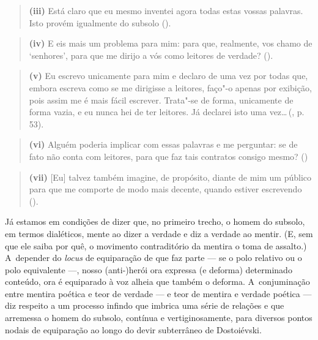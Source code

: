 \begin{quote}
\textbf{(iii)} Está claro que eu mesmo inventei agora todas estas vossas
palavras. Isto provém igualmente do subsolo ().
\end{quote}

\begin{quote}
\textbf{(iv)} E eis mais um problema para mim: para que, realmente, vos
chamo de `senhores', para que me dirijo a vós como leitores de verdade?
().
\end{quote}

\begin{quote}
\textbf{(v)} Eu escrevo unicamente para mim e declaro de uma vez por
todas que, embora escreva como se me dirigisse a leitores, faço"-o apenas
por exibição, pois assim me é mais fácil escrever. Trata"-se de forma,
unicamente de forma vazia, e eu nunca hei de ter leitores. Já declarei
isto uma vez\ldots \,(, p. 53).
\end{quote}

\begin{quote}
\textbf{(vi)} Alguém poderia implicar com essas palavras e me perguntar:
se de fato não conta com leitores, para que faz tais contratos consigo
mesmo? ()
\end{quote}

\begin{quote}
\textbf{(vii)} {[}Eu{]} talvez também imagine, de propósito, diante de
mim um público para que me comporte de modo mais decente, quando estiver
escrevendo ().
\end{quote}

Já estamos em condições de dizer que, no primeiro trecho, o homem do
subsolo, em termos dialéticos, mente ao dizer a verdade e diz a verdade
ao mentir. (E, sem que ele saiba por quê, o movimento contraditório da
mentira o toma de assalto.) A~depender do \emph{locus} de equiparação de
que faz parte --- se o polo relativo ou o polo equivalente ---, nosso
\mbox{(anti-)herói} ora expressa (e deforma) determinado conteúdo, ora é
equiparado à voz alheia que também o deforma. A~conjuminação entre
mentira poética e teor de verdade --- e teor de mentira e verdade poética
--- diz respeito a um processo infindo que imbrica uma série de relações
e que arremessa o homem do subsolo, contínua e vertiginosamente, para
diversos pontos nodais de equiparação ao longo do devir subterrâneo de
Dostoiévski.

